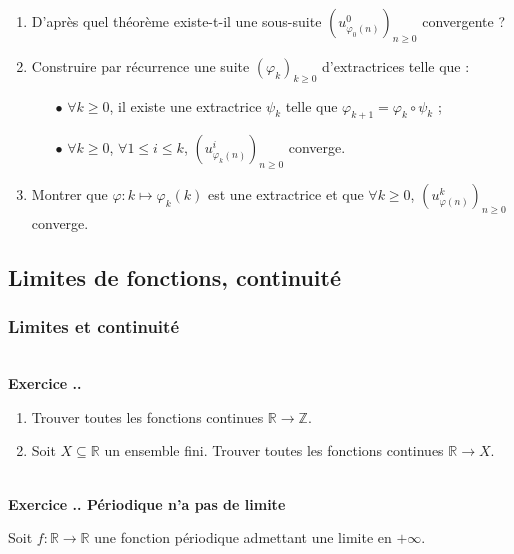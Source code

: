 \documentclass{article}
\newcommand{\mb}[1]{\mathbb{#1}}
\newcounter{exo}
\newcommand{\exercice}[1][\null]{\textbf{\\ Exercice \thesection.\theexo. #1} \addtocounter{exo}{1}}
\begin{document}
\begin{enumerate}

\item D'après quel théorème existe-t-il une sous-suite $\left(u^0_{\varphi_0(n)}\right)_{n \ge 0}$ convergente ?

\item Construire par récurrence une suite $(\varphi_k)_{k \ge 0}$ d'extractrices telle que :

\begin{itemize}

\item[$\bullet$] $\forall k \ge 0$, il existe une extractrice $\psi_k$ telle que $\varphi_{k+1} = \varphi_k \circ \psi_k$ ;

\item[$\bullet$] $\forall k \ge 0$, $\forall 1 \le i \le k$, $\left(u^i_{\varphi_k(n)}\right)_{n \ge 0}$ converge.

\end{itemize}

\item Montrer que $\varphi : k \mapsto \varphi_k(k)$ est une extractrice et que $\forall k \ge 0$, $\left(u^k_{\varphi(n)}\right)_{n \ge 0}$ converge.


\end{enumerate}


\subsection{Limites de fonctions, continuité}

\subsubsection{Limites et continuité}

\exercice

\begin{enumerate}

\item Trouver toutes les fonctions continues $\mb{R} \rightarrow \mb{Z}$.

\item Soit $X\subseteq \mb{R}$ un ensemble fini. Trouver toutes les fonctions continues $\mb{R} \rightarrow X$.

\end{enumerate}


\exercice[Périodique n'a pas de limite]

Soit $f : \mb{R} \rightarrow \mb{R}$ une fonction périodique admettant une limite en $+ \infty$.
\end{document}

